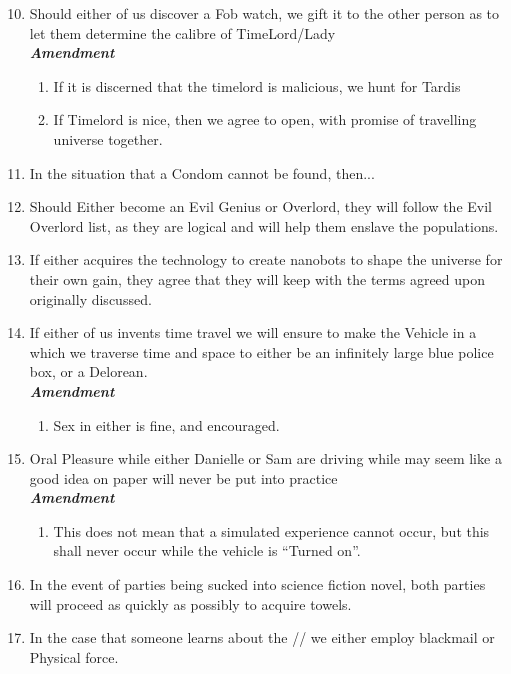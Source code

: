 \begin{enumerate}
  \setcounter{enumi}{9}
  \item Should either of us discover a Fob watch, we gift it to the other person as to let them determine the calibre of TimeLord/Lady
  \\ \textbf{\emph{Amendment}}
  \begin{enumerate}
    \item If it is discerned that the timelord is malicious, we hunt for Tardis
    \item If Timelord is nice, then we agree to open, with promise of travelling universe together. 
  \end{enumerate}
  \item In the situation that a Condom cannot be found, then...
  \item Should Either become an Evil Genius or Overlord, they will follow the Evil Overlord list, 
  as they are logical and will help them enslave the populations. 
  \item If either acquires the technology to create nanobots to shape the universe for their own gain, 
  they agree that they will keep with the terms agreed upon originally discussed.
  \setcounter{enumi}{31}
  \item If either of us invents time travel we will ensure to make the Vehicle in a which we traverse time and space to either be an 
  infinitely large blue police box, or a Delorean.
  \\ \textbf{\emph{Amendment}}
  \begin{enumerate}
    \item Sex in either is fine, and encouraged.
  \end{enumerate}
  \setcounter{enumi}{34}
  \item Oral Pleasure while either Danielle or Sam are driving while may seem like a good idea on paper will never be put into practice
  \\ \textbf{\emph{Amendment}}
  \begin{enumerate}
    \item This does not mean that a simulated experience cannot occur, but this shall never occur while the vehicle is ``Turned on''. 
  \end{enumerate}
  \setcounter{enumi}{41}
  \item In the event of parties being sucked into science fiction novel, both parties will proceed as quickly as possibly to acquire towels.
  \item In the case that someone learns about the //  we either employ blackmail or Physical force.

\end{enumerate}
